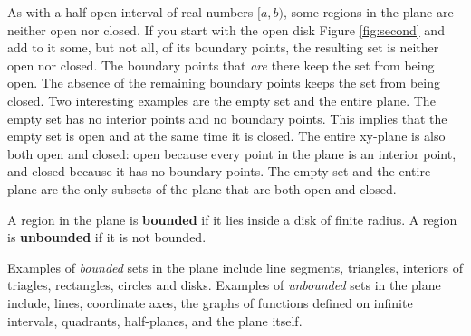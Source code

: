 \documentclass[12pt,a4paper,draft]{article}
\newenvironment{definition}{\begin{definitionbox}}{\end{definitionbox}\vspace{1\baselineskip}}
\begin{document}
\noindent As with a half-open interval of real numbers \([a,b)\), some regions in the plane are neither open nor closed. If you start with the open disk Figure \ref{fig:second} and add to it some, but not all, of its boundary points, the resulting set is neither open nor closed. The boundary points that \textit{are} there keep the set from being open. The absence of the remaining boundary points keeps the set from being closed. Two interesting examples are the empty set and the entire plane. The empty set has no interior points and no boundary points. This implies that the empty set is open and at the same time it is closed. The entire xy-plane is also both open and closed: open because every point in the plane is an interior point, and closed because it has no boundary points. The empty set and the entire plane are the only subsets of the plane that are both open and closed.

\begin{definition}
    A region in the plane is \textbf{bounded} if it lies inside a disk of finite radius. A region is \textbf{unbounded} if it is not bounded.
    
\end{definition}
Examples of \textit{bounded} sets in the plane include line segments, triangles, interiors of triagles, rectangles, circles and disks. Examples of \textit{unbounded} sets in the plane include, lines, coordinate axes, the graphs of functions defined on infinite intervals, quadrants, half-planes, and the plane itself.

\newpage
\end{document}

